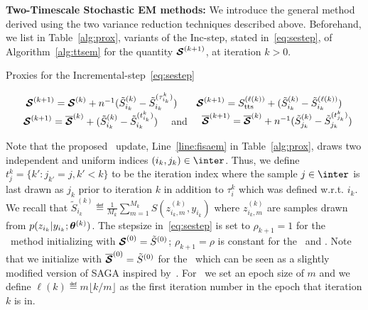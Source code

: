 \documentclass[12pt]{article}
\begin{document}
\medskip
\noindent \textbf{Two-Timescale Stochastic EM methods:}
We introduce the general method derived using the two variance reduction techniques described above.
Beforehand, we list in Table~\ref{alg:prox}, variants of the {Inc-step}, stated in~\eqref{eq:sestep}, of Algorithm~\ref{alg:ttsem} for the quantity ${\bm{\mathcal{S}}}^{(k+1)}$, at iteration $k >0$.

 \begin{protocol}[H]
\caption{Proxies for the Incremental-step~\eqref{eq:sestep}}\label{alg:prox}
  \begin{algorithmic}[1]
  \STATE {\ISAEM\ }$\hspace{0.7cm} {\bm{\mathcal{S}}}^{(k+1)} = {\bm{\mathcal{S}}}^{(k)} + n^{-1} ( \tilde{S}_{i_k}^{(k)}  - \tilde{S}_{i_k}^{(\tau_{i_k}^k)} ) \label{eq:isaem}$
    \STATE {\SAEMVR\ }$\hspace{0.5cm} {\bm{\mathcal{S}}}^{(k+1)}  = S_{\textrm{tts}}^{(\ell(k))} +  ( \tilde{S}_{i_k}^{(k)}  -\tilde{S}_{i_k}^{(\ell(k))} ) \label{eq:vrsaem}$
      \STATE {\FISAEM\ }$\hspace{0.6cm} {\bm{\mathcal{S}}}^{(k+1)} = \overline{{\bm{\mathcal{S}}}}^{(k)} + ( \tilde{S}_{i_k}^{(k)}  - \tilde{S}_{i_k}^{(t_{i_k}^k)} )\quad \label{eq:fisaem}$ and
             $ \quad \overline{{\bm{\mathcal{S}}}}^{(k+1)} = \overline{{\bm{\mathcal{S}}}}^{(k)} + n^{-1} ( \tilde{S}_{j_k}^{(k)}  - \tilde{S}_{j_k}^{(t_{j_k}^k)} )$ \label{line:fisaem}
  \end{algorithmic}
\end{protocol}

Note that the proposed \FISAEM\ update, Line~\ref{line:fisaem} in Table~\ref{alg:prox}, draws {two} {independent} and {uniform} indices $(i_k, j_k) \in \inter$. 
Thus, we define $t_j^k = \{ k' : j_{k'} = j , k' < k \}$ to be the iteration index where the sample $j \in \inter$ is last drawn as $j_k$ prior to iteration $k$ in addition to $\tau_i^k$ which was defined w.r.t. $i_k$.
We recall that $\tilde{S}_{i_k}^{(k)} \eqdef  \frac{1}{M_k} \sum_{m=1}^{M_k} S(z_{i_k,m}^{(k)}, y_{i_k})$ where $z_{i_k,m}^{(k)}$ are samples drawn from $ p(z_{i_k}|y_{i_k};{\bm{\theta}}^{(k)})$.
The stepsize in~\eqref{eq:sestep} is set to $\rho_{k+1} = 1$ for the \ISAEM\ method initializing with ${\bm{\mathcal{S}}}^{(0)} = \tilde{S}^{(0)}$; $\rho_{k+1} = \rho$ is  constant for the \SAEMVR\ and \FISAEM. 
Note that we initialize with $\overline{{\bm{\mathcal{S}}}}^{(0)} = \tilde{S}^{(0)}$ for the \FISAEM\ which can be seen as a slightly modified version of SAGA inspired by~\citet{reddi2016fast}.
For \SAEMVR\, we set an epoch size of $m$ and we define $\ell(k) \eqdef m \lfloor k/m \rfloor$ as the first iteration number in the epoch that iteration $k$ is in.
\end{document}
